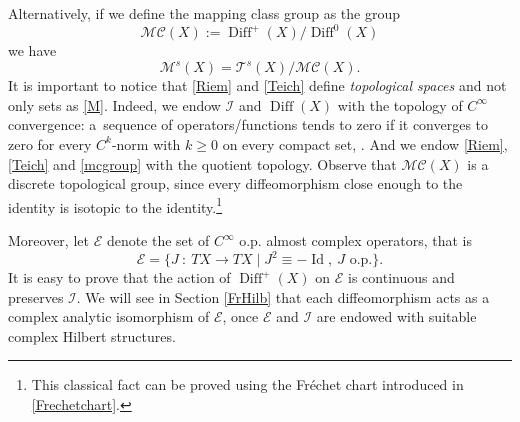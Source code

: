 \documentclass[10pt]{amsart}
\let\mathcal\mathscr
\DeclareMathOperator{\Diff}{Diff}
\DeclareMathOperator{\Id}{Id}
\theoremstyle{plain}
\theoremstyle{definition}
\theoremstyle{remark}
\numberwithin{equation}{section}
\newcommand{\cI}{\mathcal{I}}
\begin{document}
Alternatively, if we define the mapping class group as the group
\begin{equation}
\label{mcgroup}
\mathcal M\mathcal C(X):=\Diff^+(X)\big /\Diff^0(X)
\end{equation}
we have
\begin{equation}
\label{TeichRiem}
\mathcal M^s(X)=\mathcal T^s(X)\big /\mathcal M\mathcal C(X).
\end{equation}
It is important to notice that \eqref{Riem} and \eqref{Teich} define \emph{topological spaces} and not only sets as \eqref{M}. Indeed, we endow $\cI$ and $\Diff(X)$ with the topology of $C^\infty$ convergence: a~sequence of operators/functions tends to zero if it converges to zero for every $C^k$\nobreakdash-norm with $k\geq 0$ on every compact set, \cf \cite{Hamilton}. And we endow \eqref{Riem}, \eqref{Teich} and \eqref{mcgroup} with the quotient topology. Observe that $\mathcal M\mathcal C(X)$ is a discrete topological group, since every diffeomorphism close enough to the identity is isotopic to the identity.\footnote{This classical fact can be proved using the Fréchet chart introduced in \eqref{Frechetchart}.}

Moreover, let $\mathcal E$ denote the set of $C^\infty$ o.p. almost complex operators, that is
\begin{equation}
\label{E}
\mathcal E=\{J\ :\ TX\longrightarrow TX\mid J^2\equiv -\Id,\ J\text{ o.p.}\}.
\end{equation}
It is easy to prove that the action of $\Diff^+(X)$ on $\mathcal E$ is continuous and preserves $\cI$. We will see in Section \ref{FrHilb} that each diffeomorphism acts as a complex analytic isomorphism of $\mathcal E$, once $\mathcal E$ and $\cI$ are endowed with suitable complex Hilbert structures.
\end{document}
